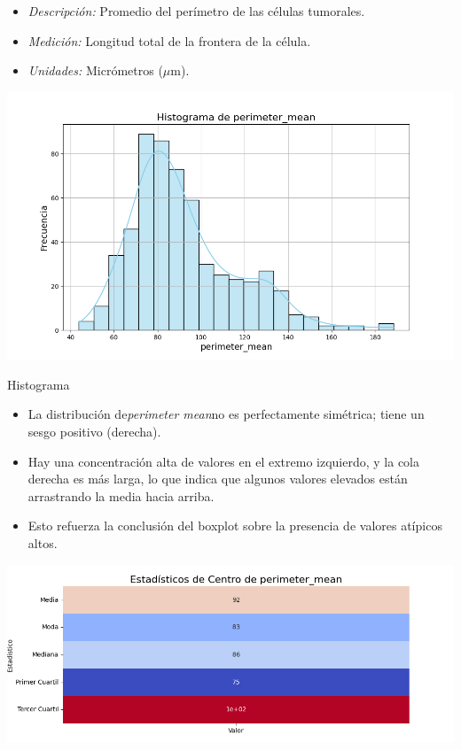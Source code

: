 \documentclass[a4paper, 12pt]{article}
\begin{document}
    \begin{itemize}
	\item \textit{Descripción:} Promedio del perímetro de las células tumorales.
	\item \textit{Medición:} Longitud total de la frontera de la célula.
	\item \textit{Unidades:} Micrómetros ($\mu$m).
\end{itemize}

	\includegraphics[width=\textwidth]{../Plots/plots_stats/perimeter_mean/histograma_perimeter_mean.png}

Histograma

\begin{itemize}
\item La distribución de\textit{perimeter mean}no es perfectamente simétrica; tiene un sesgo positivo (derecha).
\item Hay una concentración alta de valores en el extremo izquierdo, y la cola derecha es más larga, lo que indica que algunos valores elevados están arrastrando la media hacia arriba.
\item Esto refuerza la conclusión del boxplot sobre la presencia de valores atípicos altos.
\end{itemize}



\includegraphics[width=\textwidth]{../Plots/plots_stats/perimeter_mean/estadisticas_centro_perimeter_mean.png}
\end{document}
